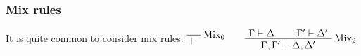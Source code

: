 \subsubsection{Mix rules}\label{mix-rules}

It is quite common to consider \href{Mix}{mix rules}:
\(\LabelRule{\rulename{Mix}_0}
\NulRule{\vdash}
\DisplayProof
\qquad
\AxRule{\Gamma \vdash \Delta}
\AxRule{\Gamma' \vdash \Delta'}
\LabelRule{\rulename{Mix}_2}
\BinRule{\Gamma,\Gamma' \vdash \Delta,\Delta'}
\DisplayProof\)

